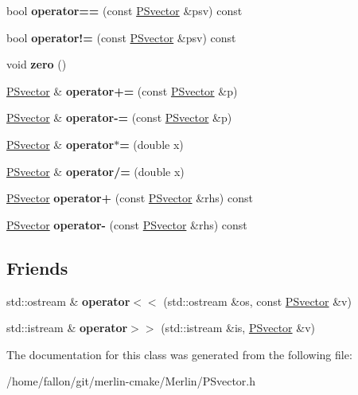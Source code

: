 \begin{DoxyCompactItemize}
bool {\bfseries operator==} (const \hyperlink{classPSvector}{P\+Svector} \&psv) const
\item 
\mbox{\label{classPSvector_ac80760393540dc4f80a882763944e380}} 
bool {\bfseries operator!=} (const \hyperlink{classPSvector}{P\+Svector} \&psv) const
\item 
\mbox{\label{classPSvector_ad4eabf08dca35bf15a33732d0b441c93}} 
void {\bfseries zero} ()
\item 
\mbox{\label{classPSvector_a4482eb287a0410b583540329ec6a7fce}} 
\hyperlink{classPSvector}{P\+Svector} \& {\bfseries operator+=} (const \hyperlink{classPSvector}{P\+Svector} \&p)
\item 
\mbox{\label{classPSvector_a119742f4133539fd90c28a294ef8d064}} 
\hyperlink{classPSvector}{P\+Svector} \& {\bfseries operator-\/=} (const \hyperlink{classPSvector}{P\+Svector} \&p)
\item 
\mbox{\label{classPSvector_a05a408f95b2f470d4c9363a35cd2190d}} 
\hyperlink{classPSvector}{P\+Svector} \& {\bfseries operator$\ast$=} (double x)
\item 
\mbox{\label{classPSvector_a8f9849f446f2e8513ef571a53ebc5a72}} 
\hyperlink{classPSvector}{P\+Svector} \& {\bfseries operator/=} (double x)
\item 
\mbox{\label{classPSvector_a8d4833a60507c7fa7cf9494ce1988579}} 
\hyperlink{classPSvector}{P\+Svector} {\bfseries operator+} (const \hyperlink{classPSvector}{P\+Svector} \&rhs) const
\item 
\mbox{\label{classPSvector_a049d77230193114620b2c8d94f0dd93c}} 
\hyperlink{classPSvector}{P\+Svector} {\bfseries operator-\/} (const \hyperlink{classPSvector}{P\+Svector} \&rhs) const
\end{DoxyCompactItemize}
\subsection*{Friends}
\begin{DoxyCompactItemize}
\item 
\mbox{\label{classPSvector_a883c32f79cf2815f2d3e4bc8fa7fc51c}} 
std\+::ostream \& {\bfseries operator$<$$<$} (std\+::ostream \&os, const \hyperlink{classPSvector}{P\+Svector} \&v)
\item 
\mbox{\label{classPSvector_ab4d320775711cd4d007e33768fdbdd35}} 
std\+::istream \& {\bfseries operator$>$$>$} (std\+::istream \&is, \hyperlink{classPSvector}{P\+Svector} \&v)
\end{DoxyCompactItemize}


The documentation for this class was generated from the following file\+:\begin{DoxyCompactItemize}
\item 
/home/fallon/git/merlin-\/cmake/\+Merlin/P\+Svector.\+h\end{DoxyCompactItemize}
